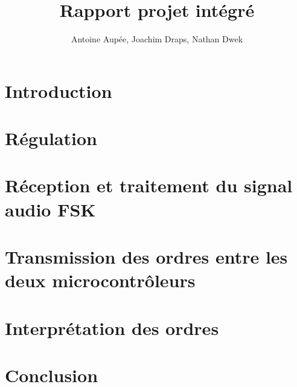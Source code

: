 \documentclass[a4paper, 11pt, frenchb]{report}
\title{Rapport projet intégré}
\author{Antoine Aupée, Joachim Draps, Nathan Dwek}
\begin{document}

\setcounter{page}{2}
\tableofcontents

\chapter{Introduction}


\chapter{Régulation\label{chap:regul}}


\chapter{Réception et traitement du signal audio FSK\label{chap:audio}}


\chapter{Transmission des ordres entre les deux microcontrôleurs\label{chap:uart}}


\chapter{Interprétation des ordres\label{chap:decision}}


\chapter{Conclusion\label{chap:conclusion}}


\listoffigures
\setcounter{page}{1}

\end{document}
